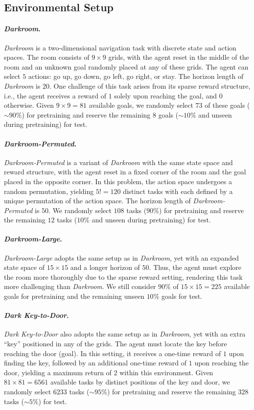 \documentclass{article}
\begin{document}
\subsection{Environmental Setup}
\label{append_env_setup}
\paragraph{\textit{Darkroom}.}
\textit{Darkroom} is a two-dimensional navigation task with discrete state and action spaces. The room consists of $9 \times 9$ grids, with the agent reset in the middle of the room and an unknown goal randomly placed at any of these grids. The agent can select $5$ actions: go up, go down, go left, go right, or stay. The horizon length of \textit{Darkroom} is $20$. One challenge of this task arises from its sparse reward structure, i.e., the agent receives a reward of $1$ solely upon reaching the goal, and $0$ otherwise.
Given $9 \times 9 = 81$ available goals, we randomly select $73$ of these goals ($\sim 90\%$) for pretraining and reserve the remaining $8$ goals ($\sim 10\%$ and unseen during pretraining) for test.
\paragraph{\textit{Darkroom-Permuted}.}
\textit{Darkroom-Permuted} is a variant of \textit{Darkroom} with the same state space and reward structure, with the agent reset in a fixed corner of the room and the goal placed in the opposite corner. In this problem, the action space undergoes a random permutation, yielding $5! = 120$ distinct tasks with each defined by a unique permutation of the action space. The horizon length of \textit{Darkroom-Permuted} is $50$. We randomly select $108$ tasks ($90\%$) for pretraining and reserve the remaining $12$ tasks ($10\%$ and unseen during pretraining) for test.
\paragraph{\textit{Darkroom-Large}.}
\textit{Darkroom-Large} adopts the same setup as in \textit{Darkroom}, yet with an expanded state space of $15 \times 15$ and a longer horizon of $50$. Thus, the agent must explore the room more thoroughly due to the sparse reward setting, rendering this task more challenging than \textit{Darkroom}. We still consider $90\%$ of $15 \times 15 = 225$ available goals for pretraining and the remaining unseen $10\%$ goals for test.
\paragraph{\textit{Dark Key-to-Door}.}
\textit{Dark Key-to-Door} also adopts the same setup as in \textit{Darkroom}, yet with an extra ``key'' positioned in any of  the grids. The agent must locate the key before reaching the door (goal). In this setting, it receives a one-time reward of $1$ upon finding the key, followed by an additional one-time reward of $1$ upon reaching the door, yielding a maximum return of $2$ within this environment.
Given $81 \times 81 = 6561$ available tasks by distinct positions of the key and door, we randomly select $6233$ tasks ($\sim 95\%$) for pretraining and reserve the remaining $328$ tasks ($\sim 5\%$) for test.
\end{document}
